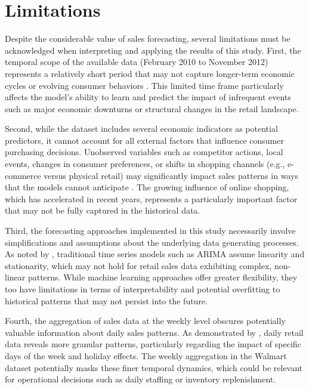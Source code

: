 \section{Limitations}

Despite the considerable value of sales forecasting, several limitations must be acknowledged when interpreting and applying the results of this study. First, the temporal scope of the available data (February 2010 to November 2012) represents a relatively short period that may not capture longer-term economic cycles or evolving consumer behaviors \cite{Zhang:2021}. This limited time frame particularly affects the model's ability to learn and predict the impact of infrequent events such as major economic downturns or structural changes in the retail landscape.

Second, while the dataset includes several economic indicators as potential predictors, it cannot account for all external factors that influence consumer purchasing decisions. Unobserved variables such as competitor actions, local events, changes in consumer preferences, or shifts in shopping channels (e.g., e-commerce versus physical retail) may significantly impact sales patterns in ways that the models cannot anticipate \cite{Fildes:2019}. The growing influence of online shopping, which has accelerated in recent years, represents a particularly important factor that may not be fully captured in the historical data.

Third, the forecasting approaches implemented in this study necessarily involve simplifications and assumptions about the underlying data generating processes. As noted by \cite{Pao:2017}, traditional time series models such as ARIMA assume linearity and stationarity, which may not hold for retail sales data exhibiting complex, non-linear patterns. While machine learning approaches offer greater flexibility, they too have limitations in terms of interpretability and potential overfitting to historical patterns that may not persist into the future.

Fourth, the aggregation of sales data at the weekly level obscures potentially valuable information about daily sales patterns. As demonstrated by \cite{McElroy:2018}, daily retail data reveals more granular patterns, particularly regarding the impact of specific days of the week and holiday effects. The weekly aggregation in the Walmart dataset potentially masks these finer temporal dynamics, which could be relevant for operational decisions such as daily staffing or inventory replenishment.

